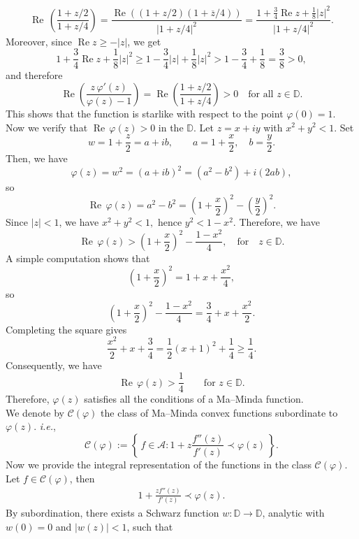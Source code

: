 \documentclass[a4paper,12pt,reqno]{amsart} %
\numberwithin{equation}{section}
\theoremstyle{definition}
\begin{document}
\[
\operatorname{Re}\,\left(\frac{1+z/2}{1+z/4}\right)
=
\frac{\operatorname{Re}\!\left((1+z/2)\left(1+\overline{z}/4\right)\right)}{|1+z/4|^{2}}
=
\frac{1+\frac34\operatorname{Re}z+\frac18|z|^{2}}{|1+z/4|^{2}}.
\]
Moreover, since $\operatorname{Re}z\ge -|z|$, we get
\[
1+\frac34\operatorname{Re}z+\frac18|z|^{2}
\ge
1-\frac34|z|+\frac18|z|^{2}
>
1-\frac34+\frac18
=
\frac{3}{8}
>0,
\]
and therefore
\[
\operatorname{Re}\!\left(\frac{z\,\varphi'(z)}{\varphi(z)-1}\right)
=
\operatorname{Re}\!\left(\frac{1+z/2}{1+z/4}\right) > 0
\quad \text{for all } z \in \mathbb{D}.
\]
This shows that the function is starlike with respect to the point $\varphi(0)=1$.\\[2mm]
Now we verify that $\operatorname{Re}\,\varphi(z)>0$ in the $\mathbb{D}$.
Let \(z=x+iy\) with \(x^2+y^2<1\).
Set
\[
w=1+\frac z2 = a+ib,
\qquad
a=1+\frac x2,
\quad
b=\frac y2.
\]
Then, we have 
\[
\varphi(z)=w^2=(a+ib)^2=(a^2-b^2)+i(2ab),
\]
so
\[
\operatorname{Re}\,\varphi(z)=a^2-b^2
=\left(1+\frac x2\right)^2-\left(\frac y2\right)^2.
\]
Since \(|z|<1\), we have
$
x^2+y^2<1,$
hence
$
y^2<1-x^2.
$
Therefore, we have 
\[
\operatorname{Re}\,\varphi(z)
>
\left(1+\frac x2\right)^2-\frac{1-x^2}{4}, \quad\text{for} \quad z\in \mathbb{D}.
\]
A simple computation shows that 
\[
\left(1+\frac x2\right)^2=1+x+\frac{x^2}{4},
\]
so
\[
\left(1+\frac x2\right)^2-\frac{1-x^2}{4}
=\frac34+x+\frac{x^2}{2}.
\]
Completing the square gives
\[
\frac{x^2}{2}+x+\frac34
=\frac12(x+1)^2+\frac14
\ge \frac14.
\] 
Consequently, we have 
\[
\operatorname{Re}\,\varphi(z)>\frac14 
\qquad \text{for } z\in\mathbb D.
\]
Therefore, $\varphi(z)$ satisfies all the conditions of a Ma--Minda function.\\[2mm]
We denote by $\mathcal{C}(\varphi)$ the class of Ma--Minda convex functions subordinate to $\varphi(z).$ \textit{i.e.},
\[
\mathcal{C}(\varphi)
:= \left\{\, f \in \mathcal{A} : 1+z\frac{ f''(z)}{f'(z)} \prec \varphi(z) \,\right\}.
\]
Now we provide the integral representation of the functions in the class $\mathcal{C}(\varphi).$
Let \(f\in \mathcal{C}(\varphi)\), then
\begin{align}\label{eq:2.2}
1+\frac{z f''(z)}{f'(z)} \prec \varphi(z).
\end{align}
By subordination, there exists a Schwarz function \(w:\mathbb{D}\to\mathbb{D}\),
analytic with \(w(0)=0\) and \(|w(z)|<1\), such that
\end{document}
